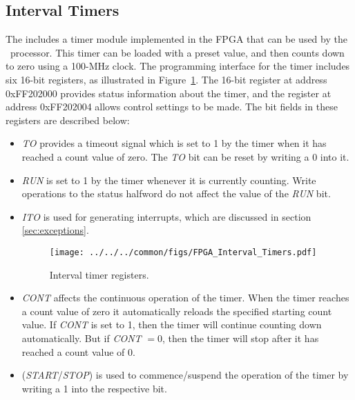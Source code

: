 \subsection{Interval Timers}
\label{sec:interval_port}

The {\it \systemNameFull} includes a timer module implemented in the FPGA that can be used by
the \processor~processor. This timer can be loaded with a preset value, and then counts down to 
zero using a 100-MHz clock. The programming interface 
for the timer includes six 16-bit registers, as illustrated in Figure~\ref{fig:interval_port}.  
The 16-bit register at address {\sf 0xFF202000} provides status information about the timer,
and the register at address {\sf 0xFF202004} allows control settings to be made.  The bit 
fields in these registers are described below:

\begin{itemize}
\item
{\it TO} provides a timeout signal which is set to 1 by the timer when it 
has reached a count value of zero.  The {\it TO} bit can be reset by writing a 0 into it. 
\item 
{\it RUN} is set to 1 by the timer whenever it is currently counting. Write 
operations to the status halfword do not affect the value of the {\it RUN} bit. 

\item 
{\it ITO} is used for generating interrupts, which are discussed in section \ref{sec:exceptions}.

\begin{figure}[h!]
   \begin{center}
       \texttt{[image: ../../../common/figs/FPGA\_Interval\_Timers.pdf]}
   \end{center}
   \caption{Interval timer registers.}
	\label{fig:interval_port}
\end{figure}

\item
{\it CONT} affects the continuous operation of the timer.  When the timer reaches
a count value of zero it automatically reloads the specified starting count value. If 
{\it CONT} is set to 1, then the timer will continue counting down automatically.
But if {\it CONT} $=0$, then the timer will stop after it has reached a count value of 0. 

\item
({\it START}/{\it STOP}) is used to commence/suspend the operation of the 
timer by writing a 1 into the respective bit.
\end{itemize}

